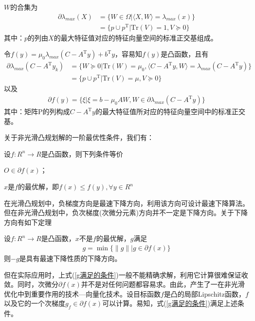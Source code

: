         $W$的合集为
        \begin{align*}
        \partial {\lambda}_{max}(X)& =\{W \in \Omega |\langle{X,W}\rangle = {\lambda}_{max}(x)\}\\
        & =\{p\cup p^\mathrm{T} |\mathrm{Tr}(V)=1,V\succeq 0\}
        \end{align*}
        其中：$p$的列由$X$的最大特征值对应的特征向量空间的标准正交基组成。
        \par
        令$f(y)={\mu}_0{\lambda}_{max}(C-A^\mathrm{T} y)+b^\mathrm{T} y$，容易知$f(y)$是凸函数，且有
        \begin{align*}
        \partial {\lambda}_{max}(C-A^\mathrm{T} y_k)& =\{W \succeq 0 |\mathrm{Tr}(W)={\mu}_0,\langle{C-A^\mathrm{T} y,W}\rangle = {\lambda}_{max}(C-A^\mathrm{T} y)\}\\
        & =\{p\cup p^\mathrm{T} |\mathrm{Tr}(V)=\mu,V\succeq 0\}
        \end{align*}
        以及
        \begin{align*}
        \partial f(y) =\{\xi|\xi=b-{\mu}_0AW,W\in \partial {\lambda}_{max}(C-A^\mathrm{T} y)\}
        \end{align*}
        其中：矩阵P的列构成$C-A^\mathrm{T} y$的最大特征值所对应的特征向量空间中的标准正交基。
        \par
        关于非光滑凸规划解的一阶最优性条件，我们有：
        \begin{theorem}
        设$f:R^n\to R$是凸函数，则下列条件等价\par
        $O \in \partial f(x)$；\par
        $x$是$f$的最优解，即$f(x)\leqslant f(y),\forall y \in R^n$
        \end{theorem}
        \par
        在光滑凸规划中，负梯度方向是最速下降方向，利用该方向可设计最速下降算法。但在非光滑凸规划中，负次梯度(次微分元素)方向并不一定是下降方向。关于下降方向有如下定理
        \begin{theorem}
        设$f:R^n\to R$是凸函数，$x$不是$f$的最优解，$g$满足
                \begin{align}
                \label{g满足的条件}
                g ={\min}\{\|g\||g \in \partial f(x)\}
                \end{align}
        则$-g$是具有最速下降性质的下降方向。
        \end{theorem}
        \par
        但在实际应用时，上式(\ref{g满足的条件})一般不能精确求解，利用它计算很难保证收敛。同时，次微分$\partial f(x)$并不是对任何问题都容易求。由此，产生了一在非光滑优化中到重要作用的技术—向量化技术。设目标函数$f$是凸的局部Lipschitz函数，$f$以及它的一个次梯度$g_{f}\in \partial f(x)$可以计算。易知，式(\ref{g满足的条件})满足上述条件。
